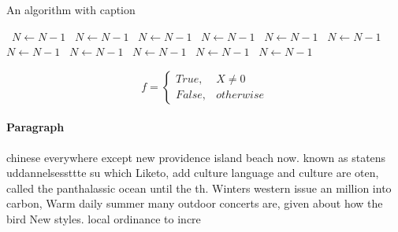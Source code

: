 \documentclass[a4paper]{article}
\begin{document}
\begin{algorithm}
\caption{An algorithm with caption}
\begin{algorithmic}
\    \State $N \gets N - 1$
\    \State $N \gets N - 1$
\    \State $N \gets N - 1$
\    \State $N \gets N - 1$
\    \State $N \gets N - 1$
\    \State $N \gets N - 1$
\    \State $N \gets N - 1$
\    \State $N \gets N - 1$
\    \State $N \gets N - 1$
\    \State $N \gets N - 1$
\    \State $N \gets N - 1$
\EndWhile
\end{algorithmic}
\end{algorithm}

\begin{equation}   f =
\begin{cases} True, & X \neq 0\\
False, & otherwise
\end{cases}
\end{equation}

\paragraph{Paragraph}
chinese everywhere except new providence island beach now. known as statens uddannelsessttte su which Liketo, add culture language and culture are oten, called the panthalassic ocean until the th. Winters western issue an million into carbon, Warm daily summer many outdoor concerts are, given about how the bird New styles. local ordinance to incre
\end{document}
